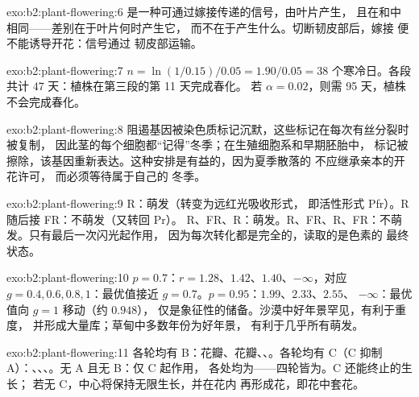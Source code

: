 \begin{solution}{exo:b2:plant-flowering:6}
是一种可通过嫁接传递的信号，由叶片产生，
且在和中相同——差别在于叶片何时产生它，
而不在于产生什么。切断韧皮部后，嫁接
便不能诱导开花：信号通过
韧皮部运输。
\end{solution}

\begin{solution}{exo:b2:plant-flowering:7}
$n = \ln(1/0.15)/0.05 = 1.90/0.05 = 38$ 个寒冷日。各段共计
$47$ 天：植株在第三段的第 11 天完成春化。
若 $\alpha = 0.02$，则需 95 天，植株不会完成春化。
\end{solution}

\begin{solution}{exo:b2:plant-flowering:8}
阻遏基因被染色质标记沉默，这些标记在每次有丝分裂时被复制，
因此茎的每个细胞都“记得”冬季；在生殖细胞系和早期胚胎中，
标记被擦除，该基因重新表达。这种安排是有益的，因为夏季散落的
不应继承亲本的开花许可，
而必须等待属于自己的
冬季。
\end{solution}

\begin{solution}{exo:b2:plant-flowering:9}
R：萌发（转变为远红光吸收形式，
即活性形式 Pfr）。R 随后接 FR：不萌发（又转回 Pr）。
R、FR、R：萌发。R、FR、R、FR：不萌发。只有最后一次闪光起作用，
因为每次转化都是完全的，读取的是色素的
最终状态。
\end{solution}

\begin{solution}{exo:b2:plant-flowering:10}
$p = 0.7$：$r = 1.28$、$1.42$、$1.40$、$-\infty$，对应 $g = 0.4, 0.6, 0.8,
1$：最优值接近 $g = 0.7$。$p = 0.95$：$1.99$、$2.33$、$2.55$、
$-\infty$：最优值向 $g = 1$ 移动（约 $0.948$），
仅是象征性的储备。沙漠中好年景罕见，有利于重度，
并形成大量库；草甸中多数年份为好年景，
有利于几乎所有萌发。
\end{solution}

\begin{solution}{exo:b2:plant-flowering:11}
各轮均有 B：花瓣、花瓣、、。各轮均有 C（C
抑制 A）：、、、。无 A 且无 B：仅 C 起作用，
各处均为——四轮皆为。C 还能终止的生长；
若无 C，中心将保持无限生长，并在花内
再形成花，即花中套花。
\end{solution}

